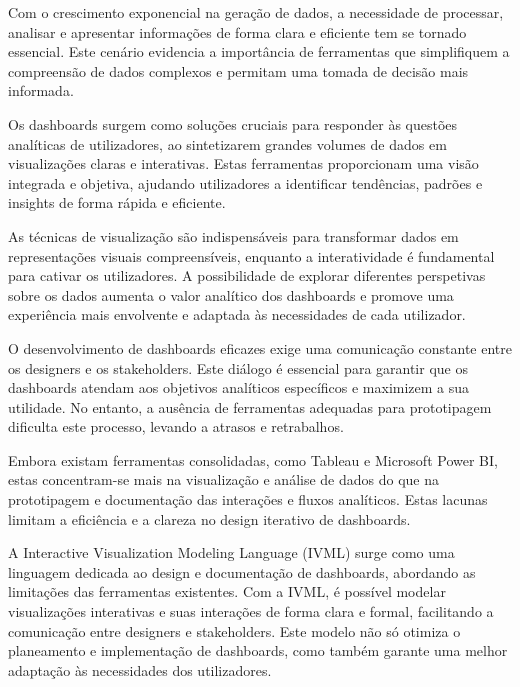 
%

Com o crescimento exponencial na geração de dados, a necessidade de processar, analisar e apresentar informações de forma clara e eficiente tem se tornado essencial. Este cenário evidencia a importância de ferramentas que simplifiquem a compreensão de dados complexos e permitam uma tomada de decisão mais informada.

Os dashboards surgem como soluções cruciais para responder às questões analíticas de utilizadores, ao sintetizarem grandes volumes de dados em visualizações claras e interativas. Estas ferramentas proporcionam uma visão integrada e objetiva, ajudando utilizadores a identificar tendências, padrões e insights de forma rápida e eficiente.

As técnicas de visualização são indispensáveis para transformar dados em representações visuais compreensíveis, enquanto a interatividade é fundamental para cativar os utilizadores. A possibilidade de explorar diferentes perspetivas sobre os dados aumenta o valor analítico dos dashboards e promove uma experiência mais envolvente e adaptada às necessidades de cada utilizador.

O desenvolvimento de dashboards eficazes exige uma comunicação constante entre os designers e os stakeholders. Este diálogo é essencial para garantir que os dashboards atendam aos objetivos analíticos específicos e maximizem a sua utilidade. No entanto, a ausência de ferramentas adequadas para prototipagem dificulta este processo, levando a atrasos e retrabalhos.

Embora existam ferramentas consolidadas, como Tableau e Microsoft Power BI, estas concentram-se mais na visualização e análise de dados do que na prototipagem e documentação das interações e fluxos analíticos. Estas lacunas limitam a eficiência e a clareza no design iterativo de dashboards.

A Interactive Visualization Modeling Language (IVML) surge como uma linguagem dedicada ao design e documentação de dashboards, abordando as limitações das ferramentas existentes. Com a IVML, é possível modelar visualizações interativas e suas interações de forma clara e formal, facilitando a comunicação entre designers e stakeholders. Este modelo não só otimiza o planeamento e implementação de dashboards, como também garante uma melhor adaptação às necessidades dos utilizadores.


